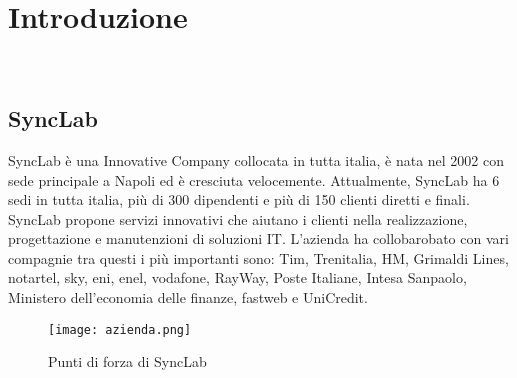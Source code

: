 
\chapter{Introduzione}
\label{cap:introduzione}




\\
\section{SyncLab }
SyncLab è una Innovative Company collocata in tutta italia, è nata nel 2002 con sede principale a Napoli ed è cresciuta velocemente. Attualmente, SyncLab ha 6 sedi in tutta italia, più di 300 dipendenti e più di 150 clienti diretti e finali.\\
SyncLab propone servizi innovativi che aiutano i clienti nella realizzazione, progettazione e manutenzioni di soluzioni IT.
L'azienda ha collobarobato con vari compagnie tra questi i più importanti sono: Tim, Trenitalia, HM, Grimaldi Lines, notartel, sky, eni, enel, vodafone, RayWay, Poste Italiane, Intesa Sanpaolo, Ministero dell'economia delle finanze, fastweb e UniCredit.
\begin{figure}[H]
    \centering
    \texttt{[image: azienda.png]}
    \caption{Punti di forza di SyncLab}
\end{figure}
